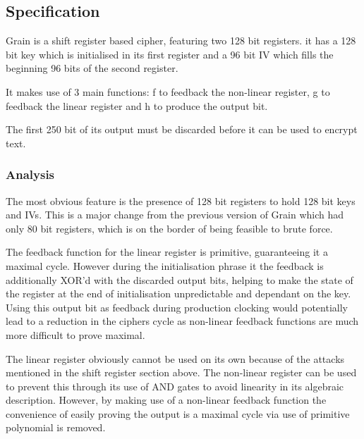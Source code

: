 \documentclass{report}
\let\Oldsubsection\subsection
\renewcommand{\subsection}{\FloatBarrier\Oldsubsection}
\let\Oldsubsubsection\subsubsection
\renewcommand{\subsubsection}{\FloatBarrier\Oldsubsubsection}
\begin{document}
\subsection{Specification}
\begin{figure}[g_i]
\end{figure}
\begin{figure}[g]
\end{figure}
Grain is a shift register based cipher, featuring two 128 bit registers. it has a 128 bit key which is initialised in its first register and a 96 bit IV which fills the beginning 96 bits of the second register.

It makes use of 3 main functions: f to feedback the non-linear register, g to feedback the linear register and h to produce the output bit.

The first 250 bit of its output must be discarded before it can be used to encrypt text.
\subsubsection{Analysis}
The most obvious feature is the presence of 128 bit registers to hold 128 bit keys and IVs. This is a major change from the previous version of Grain which had only 80 bit registers, which is on the border of being feasible to brute force. %

The feedback function for the linear register is primitive, guaranteeing it a maximal cycle. However during the initialisation phrase it the feedback is additionally XOR'd with the discarded output bits, helping to make the state of the register at the end of initialisation unpredictable and dependant on the key. Using this output bit as feedback during production clocking would potentially lead to a reduction in the ciphers cycle as non-linear feedback functions are much more difficult to prove maximal.

The linear register obviously cannot be used on its own because of the attacks mentioned in the shift register section above. The non-linear register can be used to prevent this through its use of AND gates to avoid linearity in its algebraic description. However, by making use of a non-linear feedback function  the convenience of easily proving the output is a maximal cycle via use of primitive polynomial is removed.
\end{document}

